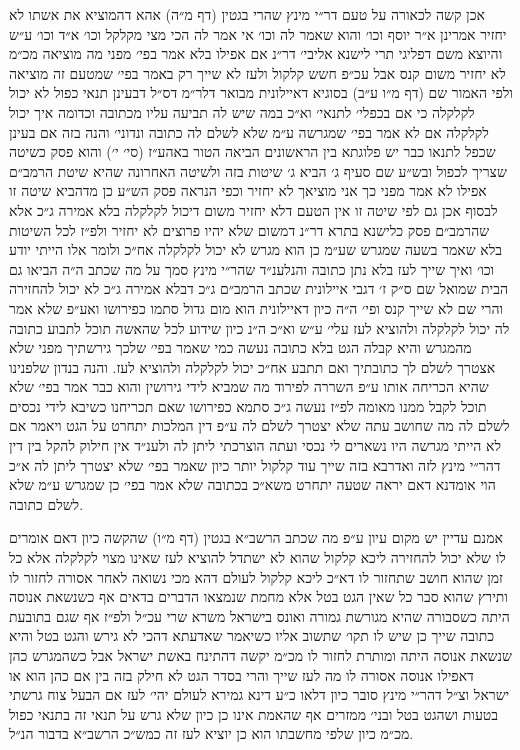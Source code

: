 \documentclass[12pt, openany]{book}
\begin{document}
\begin{multicols}{2}
אכן קשה לכאורה על טעם דר״י מינץ שהרי בגטין (דף מ״ה) אהא דהמוציא את אשתו לא יחזיר אמרינן א״ר יוסף וכו׳ והוא שאמר לה וכו׳ אי אמר לה הכי מצי מקלקל וכו׳ א״ד וכו׳ ע״ש והיוצא משם דפליגי תרי לישנא אליבי׳ דר״נ אם אפילו בלא אמר בפי׳ מפני מה מוציאה מכ״מ לא יחזיר משום קנס אבל עכ״פ חשש קלקול ולעז לא שייך רק באמר בפי׳ שמטעם זה מוציאה ולפי האמור שם (דף מ״ו ע״ב) בסוגיא דאיילונית מבואר דלר״מ דס״ל דבעינן תנאי כפול לא יכול לקלקלה כי אם בכפלי׳ לתנאי׳ וא״כ במה שיש לה תביעה עליו מכתובה וכדומה איך יכול לקלקלה אם לא אמר בפי׳ שמגרשה ע״מ שלא לשלם לה כתובה ונדוני׳ והנה בזה אם בעינן שכפל לתנאו כבר יש פלוגתא בין הראשונים הביאה הטור באהע״ז (סי׳ י׳) והוא פסק כשיטה שצריך לכפול ובש״ע שם סעיף ג׳ הביא ג׳ שיטות בזה ולשיטה האחרונה שהיא שיטת הרמב״ם אפילו לא אמר מפני כך אני מוציאך לא יחזיר וכפי הנראה פסק הש״ע כן מדהביא שיטה זו לבסוף אכן גם לפי שיטה זו אין הטעם דלא יחזיר משום דיכול לקלקלה בלא אמירה ג״כ אלא שהרמב״ם פסק כלישנא בתרא דר״נ דמשום שלא יהיו פרוצים לא יחזיר ולפ״ז לכל השיטות בלא שאמר בשעה שמגרש שע״מ כן הוא מגרש לא יכול לקלקלה אח״כ ולומר אלו הייתי יודע וכו׳ ואיך שייך לעז בלא נתן כתובה והנלענ״ד שהר״י מינץ סמך על מה שכתב ה״ה הביאו גם הבית שמואל שם ס״ק ז׳ דגבי איילונית שכתב הרמב״ם ג״כ דבלא אמירה ג״כ לא יכול להחזירה והרי שם לא שייך קנס ופי׳ ה״ה כיון דאיילונית הוא מום גדול סתמו כפירושו ואע״פ שלא אמר לה יכול לקלקלה ולהוציא לעז עלי׳ ע״ש וא״כ ה״נ כיון שידוע לכל שהאשה תוכל לתבוע כתובה מהמגרש והיא קבלה הגט בלא כתובה נעשה כמי שאמר בפי׳ שלכך גירשתיך מפני שלא אצטרך לשלם לך כתובתיך ואם תתבע אח״כ יכול לקלקלה ולהוציא לעז. והנה בנדון שלפנינו שהיא הכריחה אותו ע״פ השררה לפירוד מה שמביא לידי גירושין והוא כבר אמר בפי׳ שלא תוכל לקבל ממנו מאומה לפ״ז נעשה ג״כ סתמא כפירושו שאם תכריחנו כשיבא לידי נכסים לשלם לה מה שחושב עתה שלא יצטרך לשלם לה ע״פ דין המלכות יתחרט על הגט ויאמר אם לא הייתי מגרשה היו נשארים לי נכסי ועתה הוצרכתי ליתן לה ולענ״ד אין חילוק להקל בין דין דהר״י מינץ לזה ואדרבא בזה שייך עוד קלקול יותר כיון שאמר בפי׳ שלא יצטרך ליתן לה א״כ הוי אומדנא דאם יראה שטעה יתחרט משא״כ בכתובה שלא אמר בפי׳ כן שמגרש ע״מ שלא לשלם כתובה.\\\vspace{0pt}

אמנם עדיין יש מקום עיון ע״פ מה שכתב הרשב״א בגטין (דף מ״ו) שהקשה כיון דאם אומרים לו שלא יכול להחזירה ליכא קלקול שהוא לא ישתדל להוציא לעז שאינו מצוי לקלקלה אלא כל זמן שהוא חושב שתחזור לו דא״כ ליכא קלקול לעולם דהא מכי נשואה לאחר אסורה לחזור לו ותירץ שהוא סבר כל שאין הגט בטל אלא מחמת שנמצאו הדברים בדאים אף כשנשאת אנוסה היתה כשסבורה שהיא מגורשת גמורה ואונס בישראל משרא שרי עכ״ל ולפ״ז אף שגם בתובעת כתובה שייך כן שיש לו תקו׳ שתשוב אליו כשיאמר שאדעתא דהכי לא גירש והגט בטל והיא שנשאת אנוסה היתה ומותרת לחזור לו מכ״מ יקשה דהתינח באשת ישראל אבל כשהמגרש כהן דאפילו אנוסה אסורה לו מה לעז שייך והרי בסדר הגט לא חילק בזה בין אם כהן הוא או ישראל וצ״ל דהר״י מינץ סובר כיון דלאו כ״ע דינא גמירא לעולם יהי׳ לעז אם הבעל צוח גרשתי בטעות ושהגט בטל ובני׳ ממזרים אף שהאמת אינו כן כיון שלא גרש על תנאי זה בתנאי כפול מכ״מ כיון שלפי מחשבתו הוא כן יוציא לעז זה כמש״כ הרשב״א בדבור הנ״ל.\\\vspace{0pt}


\end{multicols}
\end{document}
